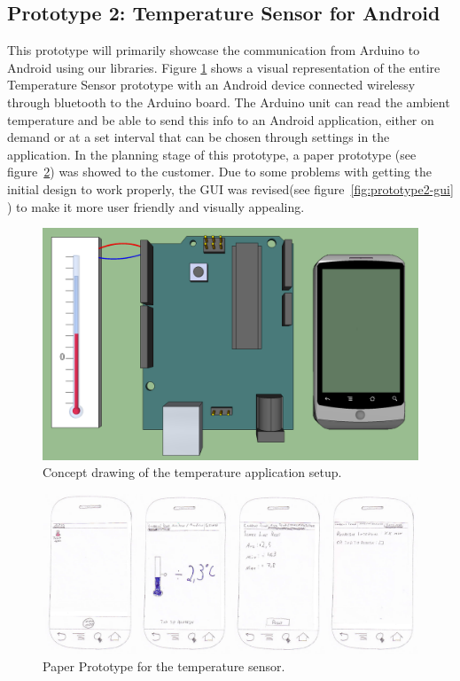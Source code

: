 	
\subsection{Prototype 2: Temperature Sensor for Android} \label{section:prototype-temp}
This prototype will primarily showcase the communication from Arduino to Android using our libraries. 
Figure \ref{fig:design-temperature} shows a visual representation of the entire Temperature Sensor
prototype with an Android device connected wirelessy through bluetooth to the Arduino board. The 
Arduino unit can read the ambient temperature and be able to send this info to an Android application,
 either on demand or at a set interval that can be chosen through settings in the application. 
In the planning stage of this prototype, a paper prototype (see figure~\ref{fig:prototype2-paper}) was showed to the
customer. Due to some problems with getting the initial design to work properly, the GUI was revised(see
figure~\ref{fig:prototype2-gui} ) to make it more user friendly and visually appealing.

\begin{figure}[H]
	\centering
	\includegraphics[scale=0.35]{img/design-temperature}
	\caption{Concept drawing of the temperature application setup.}
	\label{fig:design-temperature}
\end{figure}

\begin{figure}[H]
\centering 
\includegraphics[width=1.0\textwidth]{img/prototype2-paper.png}
\caption{Paper Prototype for the temperature sensor.}
\label{fig:prototype2-paper}
\end{figure}

